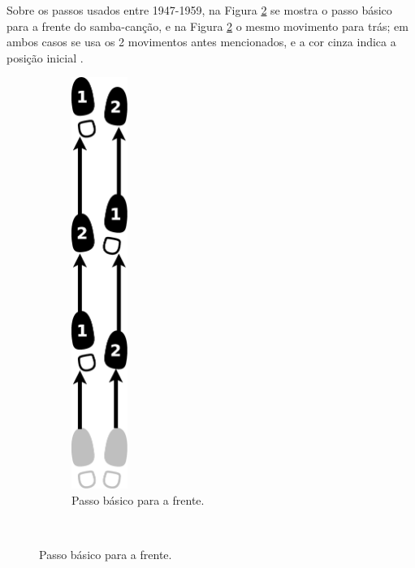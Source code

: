 \begin{itemize}
Sobre os passos usados entre 1947-1959, 
na Figura \ref{fig:samba-cancao-basico-frente} se mostra o passo básico para a frente do samba-canção,
e na  Figura \ref{fig:samba-cancao-basico-frente} o mesmo movimento para trás;
em ambos casos se usa os 2 movimentos antes mencionados, e a cor cinza indica a posição inicial \cite[pp. 51]{fornaciari1947aprender} \cite[pp. 59-60]{freitas1959danca}. 
\begin{figure}[h]
    \centering
    \begin{subfigure}[b]{0.3\textwidth}
        \centering
        \includegraphics[width=0.2\textwidth]{chapters/cap-historia-sambagafieira/samba-cancao-basico-frente.eps}
        \caption{Passo básico para a frente.}
        \label{fig:samba-cancao-basico-frente}
    \end{subfigure}
    ~ %

\end{figure}
\end{itemize}
